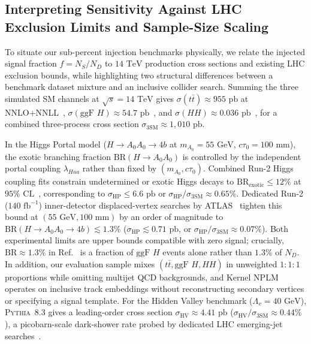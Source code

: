 \documentclass{article}
\begin{document}
\begin{dmbox}
\subsection{Interpreting Sensitivity Against LHC Exclusion Limits and Sample-Size Scaling}
\label{sec:exclusion_limits}

To situate our sub-percent injection benchmarks physically, we relate the injected signal fraction $f = N_S / N_D$ to $14\text{ TeV}$ production cross sections and existing LHC exclusion bounds, while highlighting two structural differences between a benchmark dataset mixture and an inclusive collider search. Summing the three simulated SM channels at $\sqrt{s} = 14\text{ TeV}$ gives $\sigma(t\bar{t}) \approx 955\text{ pb}$ at NNLO+NNLL~\cite{Czakon2013}, $\sigma(\text{ggF } H) \approx 54.7\text{ pb}$~\cite{LHCHXSWG4}, and $\sigma(HH) \approx 0.036\text{ pb}$~\cite{LHCHXSWG4}, for a combined three-process cross section $\sigma_{\text{3SM}} \approx 1,010\text{ pb}$.

In the Higgs Portal model ($H \to A_0 A_0 \to 4b$ at $m_{A_0} = 55\text{ GeV}$, $c\tau_0 = 100\text{ mm}$), the exotic branching fraction $\text{BR}(H \to A_0 A_0)$ is controlled by the independent portal coupling $\lambda_{Haa}$ rather than fixed by $(m_{A_0}, c\tau_0)$. Combined Run-2 Higgs coupling fits constrain undetermined or exotic Higgs decays to $\text{BR}_{\text{exotic}} \le 12\%$ at $95\%\text{ CL}$~\cite{ATLASHiggsNature2022}, corresponding to $\sigma_{\text{HP}} \le 6.6\text{ pb}$ or $\sigma_{\text{HP}} / \sigma_{\text{3SM}} \approx 0.65\%$. Dedicated Run-2 ($140\text{ fb}^{-1}$) inner-detector displaced-vertex searches by ATLAS~\cite{ATLASDV2024} tighten this bound at $(55\text{ GeV}, 100\text{ mm})$ by an order of magnitude to $\text{BR}(H \to A_0 A_0 \to 4b) \lesssim 1.3\%$ ($\sigma_{\text{HP}} \lesssim 0.71\text{ pb}$, or $\sigma_{\text{HP}} / \sigma_{\text{3SM}} \approx 0.07\%$). Both experimental limits are upper bounds compatible with zero signal; crucially, $\text{BR} \approx 1.3\%$ in Ref.~\cite{ATLASDV2024} is a fraction of $\text{ggF } H$ events alone rather than $1.3\%$ of $N_D$. In addition, our evaluation sample mixes $(t\bar{t}, \text{ggF } H, HH)$ in unweighted $1{:}1{:}1$ proportions while omitting multijet QCD backgrounds, and Kernel NPLM operates on inclusive track embeddings without reconstructing secondary vertices or specifying a signal template. For the Hidden Valley benchmark ($\Lambda_v = 40\text{ GeV}$), \textsc{Pythia}~8.3 gives a leading-order cross section $\sigma_{\text{HV}} \approx 4.41\text{ pb}$ ($\sigma_{\text{HV}} / \sigma_{\text{3SM}} \approx 0.44\%$), a picobarn-scale dark-shower rate probed by dedicated LHC emerging-jet searches~\cite{CMSEmergingJets2024}.


\end{dmbox}
\end{document}

